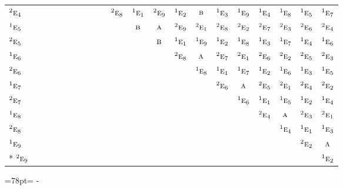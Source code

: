 \documentclass[10pt,a4paper]{article}
\newcommand{\needspace}[1]{\par\penalty-100\begingroup\dimen0=#1\relax\dimen2=\pagegoal
  \advance\dimen2-\pagetotal\ifdim\dimen0>\dimen2\relax\ifdim\dimen2>0pt\vfil\break\fi\fi
  \endgroup}
\numberwithin{equation}{section}
\newcommand{\irr}[1]{\text{\normalfont\scshape #1}}
\newcommand{\conjpair}[1]{{}^{#1}}
\begin{document}
{\begin{longtable}{@{}lcccccccccccccccccccc@{}}
$\conjpair{2}\irr{e}_{4}$ &  &  &  &  &  &  &  &  &  & $\conjpair{2}\irr{e}_{8}$ & $\conjpair{1}\irr{e}_{1}$ & $\conjpair{2}\irr{e}_{9}$ & $\conjpair{1}\irr{e}_{2}$ & $\irr{b}$ & $\conjpair{1}\irr{e}_{3}$ & $\conjpair{1}\irr{e}_{9}$ & $\conjpair{1}\irr{e}_{4}$ & $\conjpair{1}\irr{e}_{8}$ & $\conjpair{1}\irr{e}_{5}$ & $\conjpair{1}\irr{e}_{7}$\\
$\conjpair{1}\irr{e}_{5}$ &  &  &  &  &  &  &  &  &  &  & $\irr{b}$ & $\irr{a}$ & $\conjpair{2}\irr{e}_{9}$ & $\conjpair{2}\irr{e}_{1}$ & $\conjpair{2}\irr{e}_{8}$ & $\conjpair{2}\irr{e}_{2}$ & $\conjpair{2}\irr{e}_{7}$ & $\conjpair{2}\irr{e}_{3}$ & $\conjpair{2}\irr{e}_{6}$ & $\conjpair{2}\irr{e}_{4}$\\
$\conjpair{2}\irr{e}_{5}$ &  &  &  &  &  &  &  &  &  &  &  & $\irr{b}$ & $\conjpair{1}\irr{e}_{1}$ & $\conjpair{1}\irr{e}_{9}$ & $\conjpair{1}\irr{e}_{2}$ & $\conjpair{1}\irr{e}_{8}$ & $\conjpair{1}\irr{e}_{3}$ & $\conjpair{1}\irr{e}_{7}$ & $\conjpair{1}\irr{e}_{4}$ & $\conjpair{1}\irr{e}_{6}$\\
$\conjpair{1}\irr{e}_{6}$ &  &  &  &  &  &  &  &  &  &  &  &  & $\conjpair{2}\irr{e}_{8}$ & $\irr{a}$ & $\conjpair{2}\irr{e}_{7}$ & $\conjpair{2}\irr{e}_{1}$ & $\conjpair{2}\irr{e}_{6}$ & $\conjpair{2}\irr{e}_{2}$ & $\conjpair{2}\irr{e}_{5}$ & $\conjpair{2}\irr{e}_{3}$\\
$\conjpair{2}\irr{e}_{6}$ &  &  &  &  &  &  &  &  &  &  &  &  &  & $\conjpair{1}\irr{e}_{8}$ & $\conjpair{1}\irr{e}_{1}$ & $\conjpair{1}\irr{e}_{7}$ & $\conjpair{1}\irr{e}_{2}$ & $\conjpair{1}\irr{e}_{6}$ & $\conjpair{1}\irr{e}_{3}$ & $\conjpair{1}\irr{e}_{5}$\\
$\conjpair{1}\irr{e}_{7}$ &  &  &  &  &  &  &  &  &  &  &  &  &  &  & $\conjpair{2}\irr{e}_{6}$ & $\irr{a}$ & $\conjpair{2}\irr{e}_{5}$ & $\conjpair{2}\irr{e}_{1}$ & $\conjpair{2}\irr{e}_{4}$ & $\conjpair{2}\irr{e}_{2}$\\
$\conjpair{2}\irr{e}_{7}$ &  &  &  &  &  &  &  &  &  &  &  &  &  &  &  & $\conjpair{1}\irr{e}_{6}$ & $\conjpair{1}\irr{e}_{1}$ & $\conjpair{1}\irr{e}_{5}$ & $\conjpair{1}\irr{e}_{2}$ & $\conjpair{1}\irr{e}_{4}$\\
$\conjpair{1}\irr{e}_{8}$ &  &  &  &  &  &  &  &  &  &  &  &  &  &  &  &  & $\conjpair{2}\irr{e}_{4}$ & $\irr{a}$ & $\conjpair{2}\irr{e}_{3}$ & $\conjpair{2}\irr{e}_{1}$\\
$\conjpair{2}\irr{e}_{8}$ &  &  &  &  &  &  &  &  &  &  &  &  &  &  &  &  &  & $\conjpair{1}\irr{e}_{4}$ & $\conjpair{1}\irr{e}_{1}$ & $\conjpair{1}\irr{e}_{3}$\\
$\conjpair{1}\irr{e}_{9}$ &  &  &  &  &  &  &  &  &  &  &  &  &  &  &  &  &  &  & $\conjpair{2}\irr{e}_{2}$ & $\irr{a}$\\*
$\conjpair{2}\irr{e}_{9}$ &  &  &  &  &  &  &  &  &  &  &  &  &  &  &  &  &  &  &  & $\conjpair{1}\irr{e}_{2}$\\
\bottomrule\end{longtable}}
\needspace{78pt}
\end{document}

